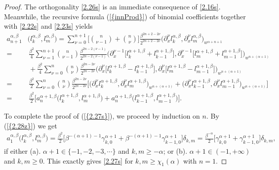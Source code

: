 \documentclass[10pt,reqno]{amsart}
\theoremstyle{remark}
\theoremstyle{definition}
\begin{document}
\begin{proof}
The orthogonality \eqref{2.26s}  is an immediate consequence of \eqref{2.16s}.
Meanwhile, the  recursive formula {{\rm (\ref{{innProd}})}} of  binomial coefficients together with
\eqref{2.22s} and \eqref{2.23s} yields
  \begin{align}\label{2.28z}
a^{\alpha,\beta}_{n+1}&\big(l^{{\alpha},{\beta}}_k,l^{{\alpha},{\beta}}_m\big)
=  \sum_{\nu=0}^{n+1}  \Big[\binom{n}{\nu-1}+ \binom{n}{\nu} \Big]  \frac{\beta^{2n+2-2\nu} }{2^{2n+2-2\nu} }\big( \partial_x^{\nu} l^{{\alpha},{\beta}}_k,
 \partial_x^{\nu} l^{{\alpha},{\beta}}_m\big)_{w^{{\alpha}+n+1}}\nonumber
 \\
=&\,
 \frac{\beta^2}{4}  \sum_{\nu=1}^{n+1}  \binom{n}{\nu-1}  \frac{\beta^{2n-2(\nu-1)}}{2^{2n-2(\nu-1)}} \big( \partial_x^{\nu-1} \big[l^{{\alpha}+1,{\beta}}_k +l^{{\alpha}+1,{\beta}}_{k-1}  \big],
 \partial_x^{\nu-1}  \big[l^{{\alpha}+1,{\beta}}_m  +l^{{\alpha}+1,{\beta}}_{m-1}  \big]\big)_{w^{n+(\alpha+1)}}\nonumber
 \\
 &\, +
  \frac{\beta^2}{4}  \sum_{\nu=0}^n  \binom{n}{\nu}  \frac{\beta^{2n-2\nu}}{2^{2n-2\nu}} \big (\partial_x^{\nu}
 \big[ l^{{\alpha}+1,{\beta}}_k-l^{{\alpha}+1,{\beta}}_{k-1}\big],
 \partial_x^{\nu}  \big[ l^{{\alpha}+1,{\beta}}_m-l^{{\alpha}+1,{\beta}}_{m-1}\big] \big)_{w^{n+(\alpha+1)}}
 \\
 =&\, \frac{\beta^2}{2}  \sum_{\nu=0}^n  \binom{n}{\nu}  \frac{\beta^{2n-2\nu}}{2^{2n-2\nu}}
 \big[ \big(\partial_x^{\nu}  l^{{\alpha}+1,{\beta}}_k, \partial_x^{\nu}   l^{{\alpha}+1,{\beta}}_m\big)_{w^{n+(\alpha+1)}}
  + \big(\partial_x^{\nu} l^{{\alpha}+1,{\beta}}_{k-1}, \partial_x^{\nu} l^{{\alpha}+1,{\beta}}_{m-1}\big)_{w^{n+(\alpha+1)}}  \big]
  \nonumber\\
 =&\, \frac{\beta^2}{2} \big[ a^{\alpha+1,\beta}_{n}\big(l^{\alpha+1,{\beta}}_k,l^{\alpha+1,{\beta}}_m\big) + a^{\alpha+1,\beta}_{n}\big(l^{\alpha+1,{\beta}}_{k-1},l^{\alpha+1,{\beta}}_{m-1}\big)  \big].\nonumber
  \end{align}

To complete the proof of  {{\rm (\ref{{2.27s}})}}, we proceed by induction on $n.$
 By {{\rm (\ref{{2.28z}})}} we get
    \begin{align}\label{2.29z}a^{\alpha,\beta}_{1}\big(l^{{\alpha},{\beta}}_k,l^{{\alpha},{\beta}}_m\big)= \frac{\beta^2}{2} \big[  \beta^{-(\alpha+1)-1}
    \gamma^{\alpha+1}_{k,0}  + \beta^{-(\alpha+1)-1}
    \gamma^{\alpha+1}_{k-1,0}   \big]\delta_{k,m}
   =   \frac{\beta^{-\alpha} }{2} \big[
    \gamma^{\alpha+1}_{k,0}  +
    \gamma^{\alpha+1}_{k-1,0}   \big]\delta_{k,m},
    \end{align}
if either  (a). $\alpha+1\in \{-1,-2,-3,\cdots\} $ and $k,m\geq -\alpha$; or (b). $\alpha+1\in (-1,+\infty)$ and $k,m\geq 0. $  This exactly gives
\eqref{2.27s} for $k,m\ge \chi_{1}(\alpha)$ with $n=1$.


\end{proof}
\end{document}
